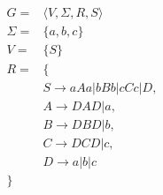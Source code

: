 \documentclass{article}
\begin{document}
\subsection{}
\begin{align*}
	G =      & \langle V, \Sigma, R, S \rangle    \\
	\Sigma = & \{ a, b, c \}                      \\
	V =      & \{ S \}                            \\
	R =      & \{                                 \\
	         & S \rightarrow aAa | bBb | cCc | D, \\
	         & A \rightarrow DAD | a,             \\
	         & B \rightarrow DBD | b,             \\
	         & C \rightarrow DCD | c,             \\
	         & D \rightarrow a | b | c            \\
	\}
\end{align*}
\end{document}
